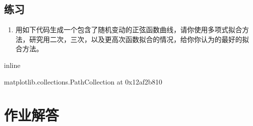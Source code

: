 \documentclass[letterpaper,10pt,english]{sphinxmanual}
\begin{document}
\section{练习}
\label{\detokenize{docs/prediction_model:id17}}\begin{enumerate}
%
\item {} 
用如下代码生成一个包含了随机变动的正弦函数曲线，请你使用多项式拟合方法，研究用二次，三次，以及更高次函数拟合的情况，给你你认为的最好的拟合方法。

\end{enumerate}

\begin{sphinxVerbatim}[commandchars=\\\{\}]
   
   
 inline
  \PYG{p}{[}      \PYG{p}{]}
  \PYG{p}{[}      \PYG{p}{]}
\end{sphinxVerbatim}

\begin{sphinxVerbatim}[commandchars=\\\{\}]
\PYGZlt{}matplotlib.collections.PathCollection at 0x12af2b810\PYGZgt{}
\end{sphinxVerbatim}

\noindent{}


\chapter{作业解答}
\label{\detokenize{docs/answers:id1}}\label{\detokenize{docs/answers::doc}}
\end{document}
